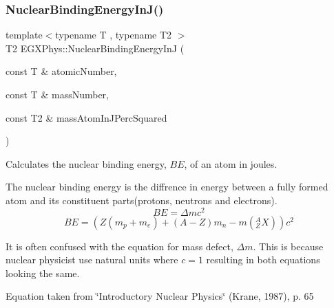 \subsubsection{\texorpdfstring{Nuclear\+Binding\+Energy\+In\+J()}{NuclearBindingEnergyInJ()}}
{\footnotesize\ttfamily template$<$typename T , typename T2 $>$ \\
T2 E\+G\+X\+Phys\+::\+Nuclear\+Binding\+Energy\+InJ (\begin{DoxyParamCaption}\item[{const T \&}]{atomic\+Number,  }\item[{const T \&}]{mass\+Number,  }\item[{const T2 \&}]{mass\+Atom\+In\+J\+Perc\+Squared }\end{DoxyParamCaption})}



Calculates the nuclear binding energy, $BE$, of an atom in joules. 

The nuclear binding energy is the diffrence in energy between a fully formed atom and its constituent parts(protons, neutrons and electrons). \[BE = \Delta m c^2\] \[BE = \left (Z(m_p + m_e)+(A-Z)m_n - m({^A_ZX}) \right ) c^2\]

It is often confused with the equation for mass defect, $\Delta m$. This is because nuclear physicist use natural units where $c = 1$ resulting in both equations looking the same.

Equation taken from \char`\"{}\+Introductory Nuclear Physics\char`\"{} (Krane, 1987), p. 65


